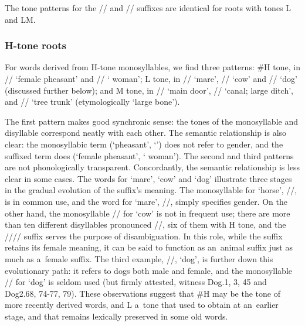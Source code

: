 	The tone patterns for the // and // suffixes are identical for roots with tones L
	and LM.
	
	
	\subsubsection{H-tone roots}
	\label{sec:htoneroots}
	
	
	For words derived from H-tone monosyllables, we find
    three patterns: \#H tone, in
	// ‘female pheasant’ and // ‘ woman’; L tone, in // ‘mare’, //
	‘cow’ and // ‘dog’ (discussed further below); and M tone, in // ‘main door’, // ‘canal; large ditch’,
	and // ‘tree trunk’ (etymologically ‘large bone’).
	
	The first pattern makes good synchronic sense: the tones of the monosyllable and disyllable
	correspond neatly with each other. The semantic relationship is also clear: the {monosyllabic} term (‘pheasant’, ‘’) does not refer to gender, and the suffixed term does (‘female pheasant’, ‘ woman’). The second and third patterns are not phonologically
	transparent. Concordantly, the semantic relationship is less clear in some cases. The words for
	‘mare’, ‘cow’ and ‘dog’ illustrate three stages in the gradual evolution of the suffix’s
	meaning. The monosyllable for ‘horse’, //, is in common use, and the word for ‘mare’,
	//, simply specifies gender. On the other hand, the monosyllable // for ‘cow’
	is not in frequent use; there are more than ten different disyllables pronounced //, six of
	them with H tone, and the //// suffix serves the purpose of disambiguation. In this role, while
	the suffix retains its female meaning, it can be said to function as an~animal suffix just as much
	as a~female suffix. The third example, //, ‘dog’, is further down this
	evolutionary path: it refers to dogs both male and female, and the monosyllable // for
	‘dog’ is seldom used (but firmly attested, witness Dog.1, 3, 45 and Dog2.68, 74-77, 79). These observations suggest that \#H may be the tone of more recently derived words, and
	L a~tone that used to obtain at an~earlier stage, and that remains lexically preserved in some old
	words.
	
